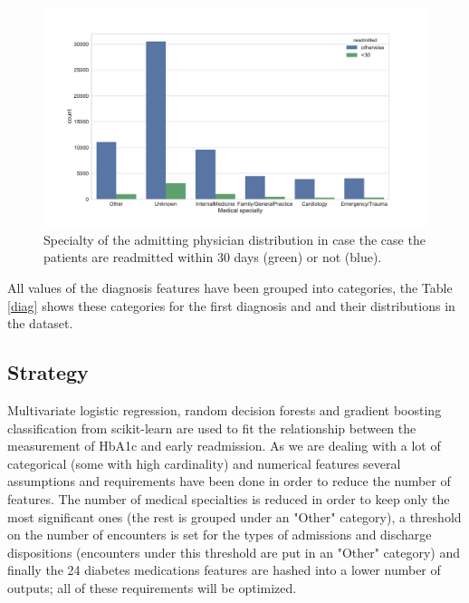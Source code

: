 \documentclass[12pt]{article}
\begin{document}
\begin{figure}[t!]
   \centering
    \includegraphics[width=16cm]{med_spec.pdf}
    \caption{\small Specialty of the admitting physician distribution in case the case the patients are readmitted within 30 days (green) or not (blue). }
    \label{med_spec}
\end{figure}

All values of the diagnosis features have been grouped into categories, the Table \ref{diag}  shows these categories for the first diagnosis and and their distributions in the dataset.

\subsection{Strategy}

Multivariate logistic regression, random decision forests and gradient boosting classification from scikit-learn are used to fit the relationship between the measurement of HbA1c and early readmission.
As we are dealing with a lot of categorical (some with high cardinality) and numerical features several assumptions and requirements have been done in order to reduce the number of features. The number of medical specialties is reduced in order to keep only the most significant ones (the rest is grouped under an "Other" category), a threshold on the number of encounters is set for the types of admissions and discharge dispositions (encounters under this threshold are put in an "Other" category) and finally the 24 diabetes medications features are hashed into a lower number of outputs; all of  these requirements will be optimized.
\end{document}

